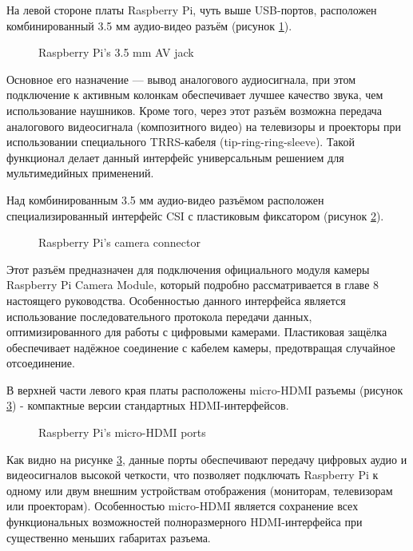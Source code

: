 На левой стороне платы Raspberry Pi, чуть выше USB-портов, расположен комбинированный 3.5 мм аудио-видео разъём (рисунок \ref{fig:jack}).

\begin{figure}[H]
	\centering
	\caption{Raspberry Pi’s 3.5 mm AV jack}
	\label{fig:jack}
\end{figure}

Основное его назначение — вывод аналогового аудиосигнала, при этом подключение к активным колонкам обеспечивает лучшее качество звука, чем использование наушников. Кроме того, через этот разъём возможна передача аналогового видеосигнала (композитного видео) на телевизоры и проекторы при использовании специального TRRS-кабеля (tip-ring-ring-sleeve). Такой функционал делает данный интерфейс универсальным решением для мультимедийных применений.

Над комбинированным 3.5 мм аудио-видео разъёмом расположен специализированный интерфейс CSI с пластиковым фиксатором (рисунок \ref{fig:camera}).

\begin{figure}[H]
	\centering
	\caption{Raspberry Pi’s camera connector}
	\label{fig:camera}
\end{figure}

Этот разъём предназначен для подключения официального модуля камеры Raspberry Pi Camera Module, который подробно рассматривается в главе 8 настоящего руководства. Особенностью данного интерфейса является использование последовательного протокола передачи данных, оптимизированного для работы с цифровыми камерами. Пластиковая защёлка обеспечивает надёжное соединение с кабелем камеры, предотвращая случайное отсоединение.


В верхней части левого края платы расположены micro-HDMI разъемы (рисунок \ref{fig:microHDMI}) - компактные версии стандартных HDMI-интерфейсов.

\begin{figure}[H]
	\centering
	\caption{Raspberry Pi’s micro-HDMI ports}
	\label{fig:microHDMI}
\end{figure}

Как видно на рисунке \ref{fig:microHDMI}, данные порты обеспечивают передачу цифровых аудио и видеосигналов высокой четкости, что позволяет подключать Raspberry Pi к одному или двум внешним устройствам отображения (мониторам, телевизорам или проекторам). Особенностью micro-HDMI является сохранение всех функциональных возможностей полноразмерного HDMI-интерфейса при существенно меньших габаритах разъема.


